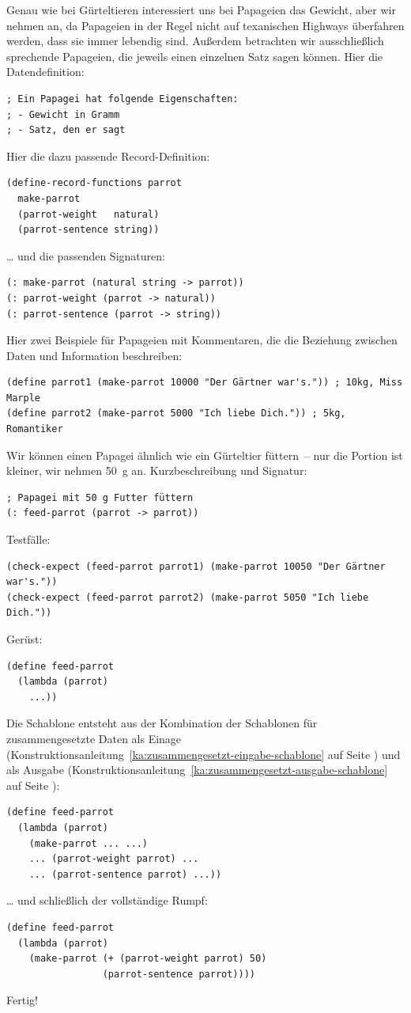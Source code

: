Genau wie bei Gürteltieren interessiert uns bei Papageien das Gewicht,
aber wir nehmen an, da Papageien in der Regel nicht auf texanischen
Highways überfahren werden, dass sie immer lebendig sind.  Außerdem
betrachten wir ausschließlich sprechende Papageien, die jeweils einen
einzelnen Satz sagen können.  Hier die Datendefinition:
%
\begin{lstlisting}
; Ein Papagei hat folgende Eigenschaften:
; - Gewicht in Gramm
; - Satz, den er sagt
\end{lstlisting}
%
Hier die dazu passende Record-Definition:
%
\begin{lstlisting}
(define-record-functions parrot
  make-parrot
  (parrot-weight   natural)
  (parrot-sentence string))
\end{lstlisting}
%
\ldots{} und die passenden Signaturen:
%
\begin{lstlisting}
(: make-parrot (natural string -> parrot))
(: parrot-weight (parrot -> natural))
(: parrot-sentence (parrot -> string))
\end{lstlisting}
%
Hier zwei Beispiele für Papageien mit Kommentaren, die die Beziehung
zwischen Daten und Information beschreiben:
%
\begin{lstlisting}
(define parrot1 (make-parrot 10000 "Der Gärtner war's.")) ; 10kg, Miss Marple
(define parrot2 (make-parrot 5000 "Ich liebe Dich.")) ; 5kg, Romantiker 
\end{lstlisting}
%
Wir können einen Papagei ähnlich wie ein Gürteltier füttern~-- nur die
Portion ist kleiner, wir nehmen 50~g an.  Kurzbeschreibung und Signatur:
%
\begin{lstlisting}
; Papagei mit 50 g Futter füttern
(: feed-parrot (parrot -> parrot))
\end{lstlisting}
%
Testfälle:
%
\begin{lstlisting}
(check-expect (feed-parrot parrot1) (make-parrot 10050 "Der Gärtner war's."))
(check-expect (feed-parrot parrot2) (make-parrot 5050 "Ich liebe Dich."))
\end{lstlisting}
%
Gerüst:
%
\begin{lstlisting}
(define feed-parrot
  (lambda (parrot)
    ...))
\end{lstlisting}
%
Die Schablone entsteht aus der Kombination der Schablonen für
zusammengesetzte Daten
als Einage (Konstruktionsanleitung~\ref{ka:zusammengesetzt-eingabe-schablone} auf
Seite \pageref{ka:zusammengesetzt-eingabe-schablone}) und als Ausgabe
(Konstruktionsanleitung~\ref{ka:zusammengesetzt-ausgabe-schablone} auf
Seite \pageref{ka:zusammengesetzt-ausgabe-schablone}):
%
\begin{lstlisting}
(define feed-parrot
  (lambda (parrot)
    (make-parrot ... ...)
    ... (parrot-weight parrot) ...
    ... (parrot-sentence parrot) ...))
\end{lstlisting}
%
\ldots{} und schließlich der vollständige Rumpf:
%
\begin{lstlisting}
(define feed-parrot
  (lambda (parrot)
    (make-parrot (+ (parrot-weight parrot) 50)
                 (parrot-sentence parrot))))
\end{lstlisting}
%
Fertig!

